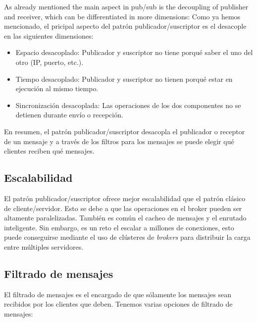As already mentioned the main aspect in pub/sub is the decoupling of publisher and receiver, which can be differentiated in more dimensions:
Como ya hemos mencionado, el pricipal aspecto del patrón publicador/suscriptor
es el desacople en las siguientes dimensiones:

\begin{itemize}\itemsep1pt \parskip0pt 
\item Espacio desacoplado: Publicador y suscriptor no tiene porqué saber el uno del otro (IP, puerto, etc.).
\item Tiempo desacoplado: Publicador y suscriptor no tienen porqué estar en ejecución al mismo tiempo.
\item Sincronización desacoplada: Las operaciones de los dos componentes no se detienen durante envío o recepción.
\end{itemize}

En resumen, el patrón publicador/suscriptor desacopla el publicador o receptor de
un mensaje y a través de los filtros para los mensajes se puede elegir qué clientes
reciben qué mensajes.

\subsection{Escalabilidad}

El patrón publicador/suscriptor ofrece mejor escalabilidad que el patrón clásico
de cliente/servidor. Esto se debe a que las operaciones en el broker pueden ser
altamente paralelizadas. También es común el cacheo de mensajes y el enrutado
inteligente. Sin embargo, es un reto el escalar a millones de conexiones, esto
puede conseguirse mediante el uso de clústeres de \emph{brokers} para distribuir
la carga entre múltiples servidores.

\subsection{Filtrado de mensajes}

El filtrado de mensajes es el encargado de que sólamente los mensajes sean
recibidos por los clientes que deben. Tenemos varias opciones de filtrado de
mensajes:

